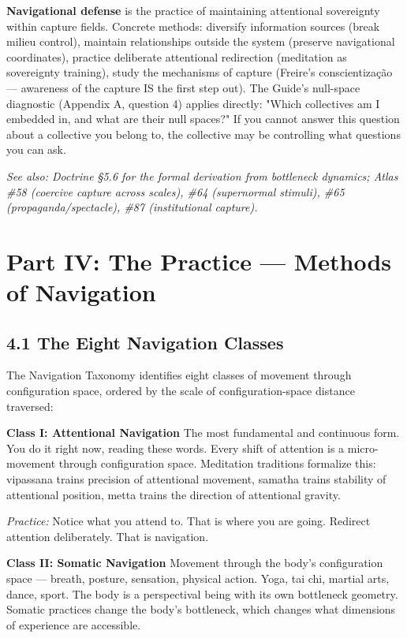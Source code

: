 \textbf{Navigational defense} is the practice of maintaining attentional sovereignty within capture fields. Concrete methods: diversify information sources (break milieu control), maintain relationships outside the system (preserve navigational coordinates), practice deliberate attentional redirection (meditation as sovereignty training), study the mechanisms of capture (Freire's conscientização — awareness of the capture IS the first step out). The Guide's null-space diagnostic (Appendix A, question 4) applies directly: "Which collectives am I embedded in, and what are their null spaces?" If you cannot answer this question about a collective you belong to, the collective may be controlling what questions you can ask.


\textit{See also: Doctrine §5.6 for the formal derivation from bottleneck dynamics; Atlas \#58 (coercive capture across scales), \#64 (supernormal stimuli), \#65 (propaganda/spectacle), \#87 (institutional capture).}


\bigskip\noindent\makebox[\textwidth]{\color{rulegray}\rule{5cm}{0.3pt}}\bigskip


\section*{Part IV: The Practice — Methods of Navigation}


\subsection*{4.1 The Eight Navigation Classes}


The Navigation Taxonomy identifies eight classes of movement through configuration space, ordered by the scale of configuration-space distance traversed:


\textbf{Class I: Attentional Navigation} The most fundamental and continuous form. You do it right now, reading these words. Every shift of attention is a micro-movement through configuration space. Meditation traditions formalize this: vipassana trains precision of attentional movement, samatha trains stability of attentional position, metta trains the direction of attentional gravity.


\textit{Practice:} Notice what you attend to. That is where you are going. Redirect attention deliberately. That is navigation.


\textbf{Class II: Somatic Navigation} Movement through the body's configuration space — breath, posture, sensation, physical action. Yoga, tai chi, martial arts, dance, sport. The body is a perspectival being with its own bottleneck geometry. Somatic practices change the body's bottleneck, which changes what dimensions of experience are accessible.


